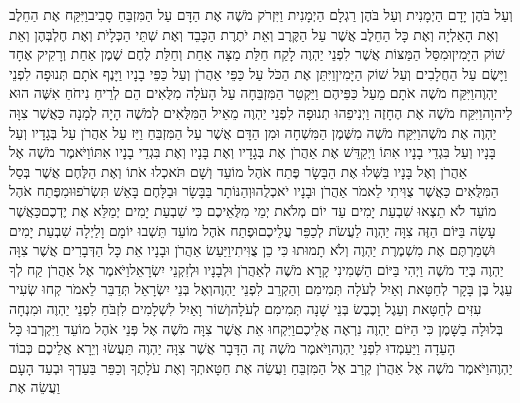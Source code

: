 \documentclass[../main/main.tex]{subfiles}
\begin{document}
\begin{multicols*}{\ncols}
וְעַל בֹּהֶן יָדָם הַיְמָנִית וְעַל בֹּהֶן רַגְלָם הַיְמָנִית וַיִּזְרֹק מֹשֶׁה אֶת הַדָּם עַל הַמִּזְבֵּחַ סָבִיב\PreVerseSpace{}וַיִּקַּח אֶת הַחֵלֶב וְאֶת הָאַלְיָה וְאֶת כָּל הַחֵלֶב אֲשֶׁר עַל הַקֶּרֶב וְאֵת יֹתֶרֶת הַכָּבֵד וְאֶת שְׁתֵּי הַכְּלָיֹת וְאֶת חֶלְבְּהֶן וְאֵת שׁוֹק הַיָּמִין\PreVerseSpace{}וּמִסַּל הַמַּצּוֹת אֲשֶׁר לִפְנֵי יַהְוֶה לָקַח חַלַּת מַצָּה אַחַת וְחַלַּת לֶחֶם שֶׁמֶן אַחַת וְרָקִיק אֶחָד וַיָּשֶׂם עַל הַחֲלָבִים וְעַל שׁוֹק הַיָּמִין\PreVerseSpace{}וַיִּתֵּן אֶת הַכֹּל עַל כַּפֵּי אַהֲרֹן וְעַל כַּפֵּי בָנָיו וַיָּנֶף אֹתָם תְּנוּפָה לִפְנֵי יַהְוֶה\PreVerseSpace{}וַיִּקַּח מֹשֶׁה אֹתָם מֵעַל כַּפֵּיהֶם וַיַּקְטֵר הַמִּזְבֵּחָה עַל הָעֹלָה מִלֻּאִים הֵם לְרֵיחַ נִיחֹחַ אִשֶּׁה הוּא לַיהוָה\PreVerseSpace{}וַיִּקַּח מֹשֶׁה אֶת הֶחָזֶה וַיְנִיפֵהוּ תְנוּפָה לִפְנֵי יַהְוֶה מֵאֵיל הַמִּלֻּאִים לְמֹשֶׁה הָיָה לְמָנָה כַּאֲשֶׁר צִוָּה יַהְוֶה אֶת מֹשֶׁה\PreVerseSpace{}וַיִּקַּח מֹשֶׁה מִשֶּׁמֶן הַמִּשְׁחָה וּמִן הַדָּם אֲשֶׁר עַל הַמִּזְבֵּחַ וַיַּז עַל אַהֲרֹן עַל בְּגָדָיו וְעַל בָּנָיו וְעַל בִּגְדֵי בָנָיו אִתּוֹ וַיְקַדֵּשׁ אֶת אַהֲרֹן אֶת בְּגָדָיו וְאֶת בָּנָיו וְאֶת בִּגְדֵי בָנָיו אִתּוֹ\PreVerseSpace{}וַיֹּאמֶר מֹשֶׁה אֶל אַהֲרֹן וְאֶל בָּנָיו בַּשְּׁלוּ אֶת הַבָּשָׂר פֶּתַח אֹהֶל מוֹעֵד וְשָׁם תֹּאכְלוּ אֹתוֹ וְאֶת הַלֶּחֶם אֲשֶׁר בְּסַל הַמִּלֻּאִים כַּאֲשֶׁר צֻוִּיתִי\SubEnd{} לֵאמֹר אַהֲרֹן וּבָנָיו יֹאכְלֻהוּ\PreVerseSpace{}וְהַנּוֹתָר בַּבָּשָׂר וּבַלָּחֶם בָּאֵשׁ תִּשְׂרֹפוּ\PreVerseSpace{}וּמִפֶּתַח אֹהֶל מוֹעֵד לֹא תֵצְאוּ שִׁבְעַת יָמִים עַד יוֹם מְלֹאת יְמֵי מִלֻּאֵיכֶם כִּי שִׁבְעַת יָמִים יְמַלֵּא אֶת יֶדְכֶם\PreVerseSpace{}כַּאֲשֶׁר עָשָׂה בַּיּוֹם הַזֶּה צִוָּה יַהְוֶה לַעֲשֹׂת לְכַפֵּר עֲלֵיכֶם\PreVerseSpace{}וּפֶתַח אֹהֶל מוֹעֵד תֵּשְׁבוּ יוֹמָם וָלַיְלָה שִׁבְעַת יָמִים וּשְׁמַרְתֶּם אֶת מִשְׁמֶרֶת יַהְוֶה וְלֹא תָמוּתוּ כִּי כֵן צֻוִּיתִי\SubEnd{}\PreVerseSpace{}וַיַּעַשׂ אַהֲרֹן וּבָנָיו אֵת כָּל הַדְּבָרִים אֲשֶׁר צִוָּה יַהְוֶה בְּיַד מֹשֶׁה \ClosedSection{}וַיְהִי בַּיּוֹם הַשְּׁמִינִי קָרָא מֹשֶׁה לְאַהֲרֹן וּלְבָנָיו וּלְזִקְנֵי יִשְׂרָאֵל\PreVerseSpace{}וַיֹּאמֶר אֶל אַהֲרֹן קַח לְךָ עֵגֶל בֶּן בָּקָר לְחַטָּאת וְאַיִל לְעֹלָה תְּמִימִם וְהַקְרֵב לִפְנֵי יַהְוֶה\PreVerseSpace{}וְאֶל בְּנֵי יִשְׂרָאֵל תְּדַבֵּר לֵאמֹר קְחוּ שְׂעִיר עִזִּים לְחַטָּאת וְעֵגֶל וָכֶבֶשׂ בְּנֵי שָׁנָה תְּמִימִם לְעֹלָה\PreVerseSpace{}וְשׁוֹר וָאַיִל לִשְׁלָמִים לִזְבֹּחַ לִפְנֵי יַהְוֶה וּמִנְחָה בְּלוּלָה בַשָּׁמֶן כִּי הַיּוֹם יַהְוֶה נִרְאֶה\SubEnd{} אֲלֵיכֶם\PreVerseSpace{}וַיִּקְחוּ אֵת אֲשֶׁר צִוָּה מֹשֶׁה אֶל פְּנֵי אֹהֶל מוֹעֵד וַיִּקְרְבוּ כָּל הָעֵדָה וַיַּעַמְדוּ לִפְנֵי יַהְוֶה\PreVerseSpace{}וַיֹּאמֶר מֹשֶׁה זֶה הַדָּבָר אֲשֶׁר צִוָּה יַהְוֶה תַּעֲשׂוּ וְיֵרָא אֲלֵיכֶם כְּבוֹד יַהְוֶה\PreVerseSpace{}וַיֹּאמֶר מֹשֶׁה אֶל אַהֲרֹן קְרַב אֶל הַמִּזְבֵּחַ וַעֲשֵׂה אֶת חַטָּאתְךָ וְאֶת עֹלָתֶךָ וְכַפֵּר בַּעַדְךָ וּבְעַד הָעָם וַעֲשֵׂה אֶת 
\end{multicols*}
\end{document}
